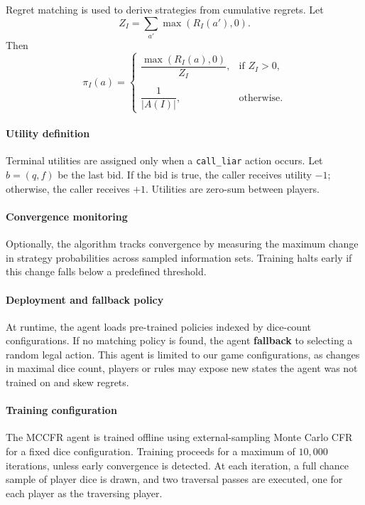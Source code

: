 Regret matching is used to derive strategies from cumulative regrets. Let
\[
Z_I = \sum_{a'} \max(R_I(a'), 0).
\]
Then
\[
\pi_I(a) =
\begin{cases}
\dfrac{\max(R_I(a), 0)}{Z_I}, & \text{if } Z_I > 0, \\ \\
\dfrac{1}{|A(I)|}, & \text{otherwise}.
\end{cases}
\]

\paragraph{\textbf{Utility definition}}
Terminal utilities are assigned only when a \texttt{call\_liar} action occurs. Let \( b = (q,f) \) be the last bid. If the bid is true, the caller receives utility \(-1\); otherwise, the caller receives \(+1\). Utilities are zero-sum between players.

\paragraph{\textbf{Convergence monitoring}}
Optionally, the algorithm tracks convergence by measuring the maximum change in strategy probabilities across sampled information sets. Training halts early if this change falls below a predefined threshold.

\paragraph{\textbf{Deployment and fallback policy}}
At runtime, the agent loads pre-trained policies indexed by dice-count configurations. If no matching policy is found, the agent \textbf{fallback} to selecting a random legal action. This agent is limited to our game configurations, as changes in maximal dice count, players or rules may expose new states the agent was not trained on and skew regrets.

\paragraph{\textbf{Training configuration}}
The MCCFR agent is trained offline using external-sampling Monte Carlo CFR for a fixed dice configuration. Training proceeds for a maximum of $10{,}000$ iterations, unless early convergence is detected. At each iteration, a full chance sample of player dice is drawn, and two traversal passes are executed, one for each player as the traversing player.

